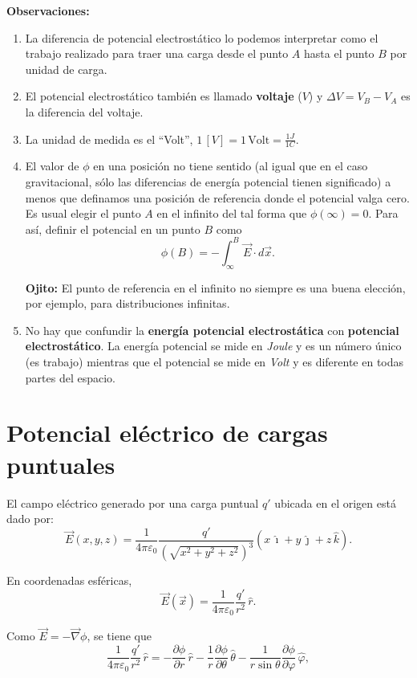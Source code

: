 \newpage
\textbf{Observaciones:}
\begin{enumerate}

\item La diferencia de potencial electrostático lo podemos interpretar como el trabajo realizado para traer una carga desde el punto $A$ hasta el punto $B$ por unidad de carga. 

\item  El potencial electrostático también es llamado \textbf{voltaje} ($V$) y $\Delta V = V_B - V_A$ es la diferencia del voltaje.

\item La unidad de medida es el “Volt”, $1 \,[V] = 1 \, \mbox{Volt} = \frac{1 J}{1C}$.

\item El valor de $\phi$ en una posición no tiene sentido (al igual que en el caso gravitacional, sólo las diferencias de energía potencial tienen significado) a menos que definamos una posición de referencia donde el potencial valga cero. Es usual elegir el punto $A$ en el infinito del tal forma que $\phi(\infty) = 0$. Para así, definir el potencial en un punto $B$ como
$$\phi(B) = - \int_{\infty}^B \vec{E} \cdot d\vec{x}.$$

\textbf{Ojito:} El punto de referencia en el infinito no siempre es una buena elección, por ejemplo, para distribuciones infinitas.

\item No hay que confundir la \textbf{energía potencial electrostática} con \textbf{potencial electrostático}. La energía potencial se mide en \textit{Joule} y es un número único (es trabajo) mientras que el potencial se mide en \textit{Volt} y es diferente en todas partes del espacio.
\end{enumerate}

\section{Potencial eléctrico de cargas puntuales}

El campo eléctrico generado por una carga puntual $q'$ ubicada en el origen está dado por:
$$\Vec{E}(x,y,z) = \frac{1}{4\pi \varepsilon_0} \frac{q'}{(\sqrt{x^2+y^2+z^2})^3} (x \,\hat{\imath} + y \, \hat{\jmath} + z\, \hat{k}).$$

En coordenadas esféricas,
$$\Vec{E}(\Vec{x}) =  \frac{1}{4\pi \varepsilon_0} \frac{q'}{r^2} \, \hat{r}.$$

Como $\vec{E} = - \vec{\nabla} \phi$, se  tiene que
$$\frac{1}{4\pi \varepsilon_0} \frac{q'}{r^2} \, \hat{r} = - \frac{\partial \phi}{\partial r} \,\hat{r} - \frac{1}{r} \frac{\partial \phi}{\partial \theta} \,\hat{\theta} - \frac{1}{r\sin\theta} \frac{\partial \phi}{\partial \varphi} \,\hat{\varphi},$$

